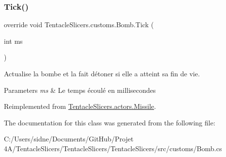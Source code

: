 \subsubsection{\texorpdfstring{Tick()}{Tick()}}
{\footnotesize\ttfamily override void Tentacle\+Slicers.\+customs.\+Bomb.\+Tick (\begin{DoxyParamCaption}\item[{int}]{ms }\end{DoxyParamCaption})\hspace{0.3cm}{\ttfamily [virtual]}}



Actualise la bombe et la fait détoner si elle a atteint sa fin de vie. 


\begin{DoxyParams}{Parameters}
{\em ms} & Le temps écoulé en millisecondes \\
\hline
\end{DoxyParams}


Reimplemented from \hyperlink{class_tentacle_slicers_1_1actors_1_1_missile_ad07d0a9fe7aa8abce9aa5df78ebbb8be}{Tentacle\+Slicers.\+actors.\+Missile}.



The documentation for this class was generated from the following file\+:\begin{DoxyCompactItemize}
\item 
C\+:/\+Users/sidne/\+Documents/\+Git\+Hub/\+Projet 4\+A/\+Tentacle\+Slicers/\+Tentacle\+Slicers/\+Tentacle\+Slicers/src/customs/Bomb.\+cs\end{DoxyCompactItemize}
